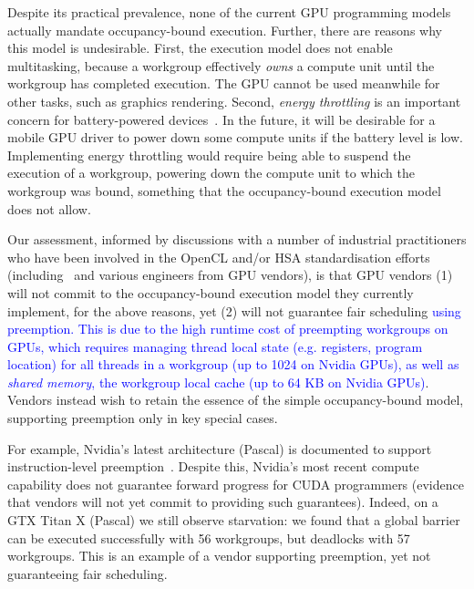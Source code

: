 \documentclass[sigconf]{acmart}
\newcommand{\TSAdded}[1]{\textcolor{blue}{#1}}
\begin{document}
Despite its practical prevalence, none of the current GPU programming
models actually mandate occupancy-bound execution.  Further, there are
reasons why this model is undesirable.
First, the execution model does not enable
multitasking, because a workgroup effectively \emph{owns} a compute
unit until the workgroup has completed execution.  The GPU cannot be used meanwhile for other
tasks, such as graphics rendering.
Second, \emph{energy throttling} is
an important concern for battery-powered devices~\cite{DBLP:journals/comsur/Vallina-RodriguezC13}.  In the future, it will be desirable for a mobile GPU driver to
power down some compute units if the battery level is low.
Implementing energy
throttling would require being able to suspend the execution of a
workgroup, powering down the compute unit to which the workgroup was
bound, something that the occupancy-bound execution model does not allow.

Our assessment, informed by discussions with a number of industrial
practitioners who have been involved in the OpenCL and/or HSA
standardisation efforts
(including~\cite{PersonalCommunicationRichards,PersonalCommunicationHowes}
and various engineers from GPU vendors), is that GPU vendors (1) will
not commit to the occupancy-bound execution model they currently
implement, for the above reasons, yet (2) will not guarantee fair
scheduling \TSAdded{using preemption. This is due to the high runtime
  cost of preempting workgroups on GPUs, which requires managing
  thread local state (e.g. registers, program location) for all
  threads in a workgroup (up to 1024 on Nvidia GPUs), as well as
  \emph{shared memory}, the workgroup local cache (up to 64 KB on
  Nvidia GPUs)}.  Vendors instead wish to retain the essence of the
  simple occupancy-bound model, supporting preemption only in key
  special cases.

For example, Nvidia's latest architecture (Pascal) is documented to
support instruction-level preemption~\cite{PascalWhitepaper}. Despite
this, Nvidia's most recent compute capability does not guarantee
forward progress for CUDA programmers (evidence that vendors will not
yet commit to providing such guarantees).  Indeed, on a GTX Titan X
(Pascal) we still observe starvation: we found that a global barrier
can be executed successfully with 56 workgroups, but deadlocks with 57
workgroups.  This is an example of a vendor supporting preemption, yet
not guaranteeing fair scheduling.
\end{document}
